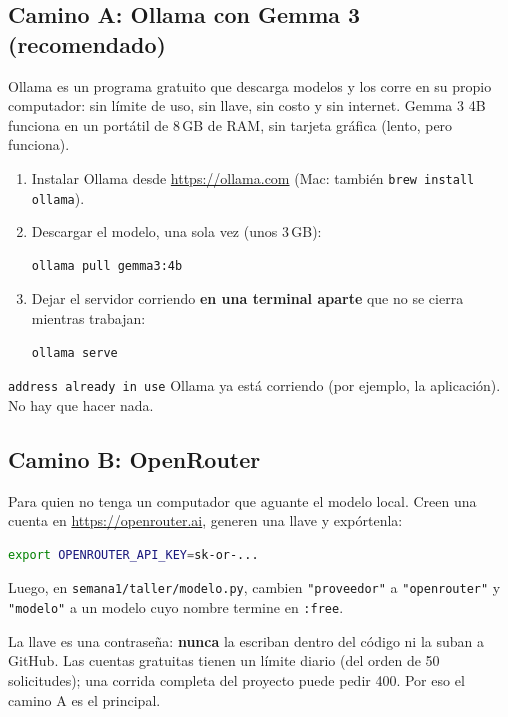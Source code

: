 \documentclass[11pt,a4paper]{article}
\newcommand{\cd}[1]{\texttt{\small #1}}
\begin{document}
\subsection{Camino A: Ollama con Gemma 3 (recomendado)}
Ollama es un programa gratuito que descarga modelos y los corre en su
propio computador: sin límite de uso, sin llave, sin costo y sin
internet. Gemma 3 4B funciona en un portátil de 8\,GB de RAM, sin
tarjeta gráfica (lento, pero funciona).
\begin{haga}
\begin{enumerate}
  \item Instalar Ollama desde \url{https://ollama.com} (Mac:
    también \cd{brew install ollama}).
  \item Descargar el modelo, una sola vez (unos 3\,GB):
\begin{lstlisting}[language=bash]
ollama pull gemma3:4b
\end{lstlisting}
  \item Dejar el servidor corriendo \textbf{en una terminal aparte} que no
    se cierra mientras trabajan:
\begin{lstlisting}[language=bash]
ollama serve
\end{lstlisting}
\end{enumerate}
\end{haga}
\begin{falla}{\texttt{address already in use}}
  Ollama ya está corriendo (por ejemplo, la aplicación). No hay que hacer
  nada.
\end{falla}

\subsection{Camino B: OpenRouter}
Para quien no tenga un computador que aguante el modelo local. Creen una
cuenta en \url{https://openrouter.ai}, generen una llave y expórtenla:
\begin{lstlisting}[language=bash]
export OPENROUTER_API_KEY=sk-or-...
\end{lstlisting}
Luego, en \cd{semana1/taller/modelo.py}, cambien \cd{"proveedor"} a
\cd{"openrouter"} y \cd{"modelo"} a un modelo cuyo nombre termine en
\cd{:free}.
\begin{ojo}
  La llave es una contraseña: \textbf{nunca} la escriban dentro del
  código ni la suban a GitHub. Las cuentas gratuitas tienen un límite
  diario (del orden de 50 solicitudes); una corrida completa del
  proyecto puede pedir 400. Por eso el camino A es el principal.
\end{ojo}
\end{document}
